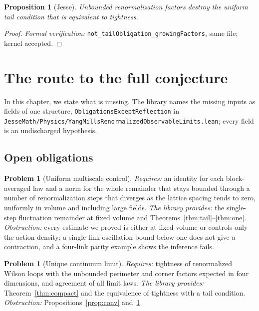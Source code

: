\documentclass[11pt]{article}
\numberwithin{equation}{subsection}
\theoremstyle{plain}
\newtheorem{proposition}[theorem]{Proposition}
\theoremstyle{definition}
\newtheorem{problem}[theorem]{Problem}
\begin{document}
\begin{proposition}[Jesse]\label{prop:tails}
Unbounded renormalization factors destroy the uniform tail condition that is equivalent to
tightness.
\end{proposition}
\begin{proof}
\emph{Formal verification:} \texttt{not\_\allowbreak{}tail\allowbreak{}Obligation\_\allowbreak{}growing\allowbreak{}Factors}, same file; kernel accepted.
\end{proof}

\section{The route to the full conjecture}\label{sec:route}

In this chapter, we state what is missing. The library names the missing inputs as fields of one
structure, \texttt{Obligations\allowbreak{}Except\allowbreak{}Reflection} in
\texttt{Jesse\allowbreak{}Math/\allowbreak{}Physics/\allowbreak{}Yang\allowbreak{}Mills\allowbreak{}Renormalized\allowbreak{}Observable\allowbreak{}Limits.\allowbreak{}lean}; every field is an
undischarged hypothesis.

\subsection{Open obligations}

\begin{problem}[Uniform multiscale control]\label{prob:rg}
\emph{Requires:} an identity for each block-averaged law and a norm for the whole remainder that
stays bounded through a number of renormalization steps that diverges as the lattice spacing
tends to zero, uniformly in volume and including large fields. \emph{The library provides:} the
single-step fluctuation remainder at fixed volume and Theorems~\ref{thm:tail}--\ref{thm:one}.
\emph{Obstruction:} every estimate we proved is either at fixed volume or controls only the
action density; a single-link oscillation bound below one does not give a contraction, and a
four-link parity example shows the inference fails.
\end{problem}

\begin{problem}[Unique continuum limit]\label{prob:limit}
\emph{Requires:} tightness of renormalized Wilson loops with the unbounded perimeter and corner
factors expected in four dimensions, and agreement of all limit laws. \emph{The library
provides:} Theorem~\ref{thm:compact} and the equivalence of tightness with a tail condition.
\emph{Obstruction:} Propositions~\ref{prop:conv} and~\ref{prop:tails}.
\end{problem}
\end{document}
